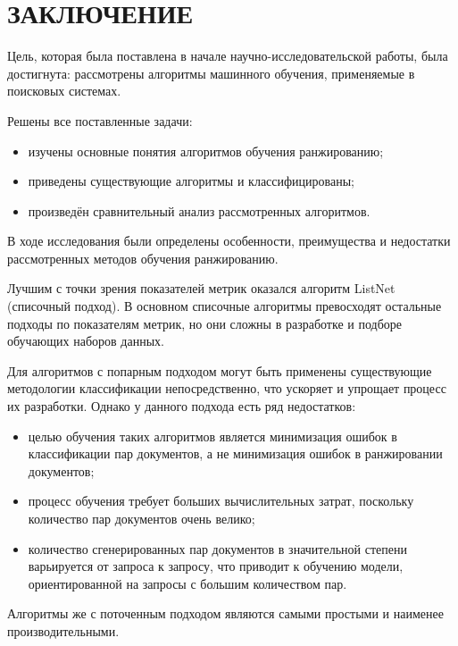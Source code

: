 \chapter*{ЗАКЛЮЧЕНИЕ}

Цель, которая была поставлена в начале научно-исследовательской работы, была достигнута: рассмотрены алгоритмы машинного обучения, применяемые в поисковых системах.

Решены все поставленные задачи:
\begin{itemize}[label=---]
	\item изучены основные понятия алгоритмов обучения ранжированию;
	\item приведены существующие алгоритмы и классифицированы;
	\item произведён сравнительный анализ рассмотренных алгоритмов.
\end{itemize}


В ходе исследования были определены особенности, преимущества и недостатки рассмотренных методов обучения ранжированию.

Лучшим с точки зрения показателей метрик оказался алгоритм ListNet (списочный подход). В основном списочные алгоритмы превосходят остальные подходы по показателям метрик, но они сложны в разработке и подборе обучающих наборов данных.

Для алгоритмов с попарным подходом могут быть применены существующие методологии классификации непосредственно, что ускоряет и упрощает процесс их разработки. Однако у данного подхода есть ряд недостатков:
\begin{itemize}[label=---]
	\item целью обучения таких алгоритмов является минимизация ошибок в классификации пар документов, а не минимизация ошибок в ранжировании документов;
	\item процесс обучения требует больших вычислительных затрат, поскольку количество пар документов очень велико;
	\item количество сгенерированных пар документов в значительной степени варьируется от запроса к запросу, что приводит к обучению модели, ориентированной на запросы с большим количеством пар.
\end{itemize}

Алгоритмы же с поточенным подходом являются самыми простыми и наименее производительными. 